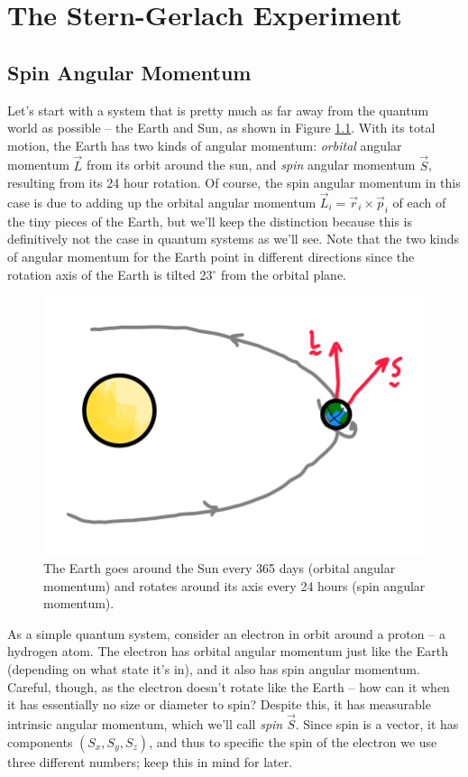 \chapter{The Stern-Gerlach Experiment}

\section{Spin Angular Momentum}

Let's start with a system that is pretty much as far away from the quantum world as possible -- the Earth and Sun, as shown in Figure \ref{fig_sun_earth}.  With its total motion, the Earth has two kinds of angular momentum:  \emph{orbital} angular momentum $\vec{L}$ from its orbit around the sun, and \emph{spin} angular momentum $\vec{S}$, resulting from its 24 hour rotation.  Of course, the spin angular momentum in this case is due to adding up the orbital angular momentum $\vec{L}_i = \vec{r}_i \times \vec{p}_i$ of each of the tiny pieces of the Earth, but we'll keep the distinction because this is definitively not the case in quantum systems as we'll see.  Note that the two kinds of angular momentum for the Earth point in different directions since the rotation axis of the Earth is tilted 23$^\circ$ from the orbital plane.

\begin{figure}
\centering\includegraphics[width=0.5\linewidth]{Figures/Chapter 1/fig_sun_earth.png}
\caption{The Earth goes around the Sun every 365 days (orbital angular momentum) and rotates around its axis every 24 hours (spin angular momentum).}
\label{fig_sun_earth}
\end{figure}

As a simple quantum system, consider an electron in orbit around a proton -- a hydrogen atom.  The electron has orbital angular momentum just like the Earth (depending on what state it's in), and it also has spin angular momentum.  Careful, though, as the electron doesn't rotate like the Earth -- how can it when it has essentially no size or diameter to spin?  Despite this, it has measurable intrinsic angular momentum, which we'll call \emph{spin} $\vec{S}$.  Since spin is a vector, it has components $(S_x, S_y, S_z)$, and thus to specific the spin of the electron we use three different numbers; keep this in mind for later.

